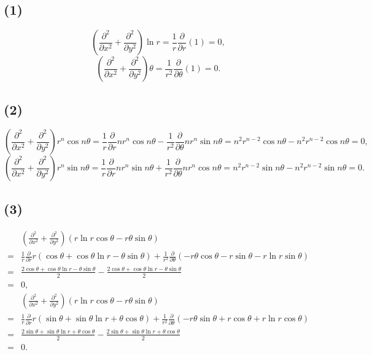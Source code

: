 \documentclass[11pt,a4paper]{article}
\begin{document}
\subsection*{(1)}
$$\left(\frac{\partial^2}{\partial x^2}+\frac{\partial^2}{\partial y^2}\right)\ln r=\frac{1}{r}\frac{\partial}{\partial r}(1)=0,$$
$$\left(\frac{\partial^2}{\partial x^2}+\frac{\partial^2}{\partial y^2}\right)\theta=\frac{1}{r^2}\frac{\partial}{\partial\theta}(1)=0.$$

\subsection*{(2)}
$$\left(\frac{\partial^2}{\partial x^2}+\frac{\partial^2}{\partial y^2}\right)r^n\cos n\theta=\frac{1}{r}\frac{\partial}{\partial r}nr^n\cos n\theta-\frac{1}{r^2}\frac{\partial}{\partial\theta}nr^n\sin n\theta=n^2r^{n-2}\cos n\theta-n^2r^{n-2}\cos n\theta=0,$$
$$\left(\frac{\partial^2}{\partial x^2}+\frac{\partial^2}{\partial y^2}\right)r^n\sin n\theta=\frac{1}{r}\frac{\partial}{\partial r}nr^n\sin n\theta+\frac{1}{r^2}\frac{\partial}{\partial\theta}nr^n\cos n\theta=n^2r^{n-2}\sin n\theta-n^2r^{n-2}\sin n\theta=0.$$

\subsection*{(3)}
\begin{align*}
    & \left(\frac{\partial^2}{\partial x^2}+\frac{\partial^2}{\partial y^2}\right)(r\ln r\cos\theta-r\theta\sin\theta)                                                                   \\
  = & \frac{1}{r}\frac{\partial}{\partial r}r(\cos\theta+\cos\theta\ln r-\theta\sin\theta)+\frac{1}{r^2}\frac{\partial}{\partial\theta}(-r\theta\cos\theta-r\sin\theta-r\ln r\sin\theta) \\
  = & \frac{2\cos\theta+\cos\theta\ln r-\theta\sin\theta}{2}-\frac{2\cos\theta+\cos\theta\ln r-\theta\sin\theta}{2}                                                                      \\
  = & 0,
\end{align*}
\begin{align*}
    & \left(\frac{\partial^2}{\partial x^2}+\frac{\partial^2}{\partial y^2}\right)(r\ln r\cos\theta-r\theta\sin\theta)                                                                   \\
  = & \frac{1}{r}\frac{\partial}{\partial r}r(\sin\theta+\sin\theta\ln r+\theta\cos\theta)+\frac{1}{r^2}\frac{\partial}{\partial\theta}(-r\theta\sin\theta+r\cos\theta+r\ln r\cos\theta) \\
  = & \frac{2\sin\theta+\sin\theta\ln r+\theta\cos\theta}{2}-\frac{2\sin\theta+\sin\theta\ln r+\theta\cos\theta}{2}                                                                      \\
  = & 0.
\end{align*}
\end{document}
